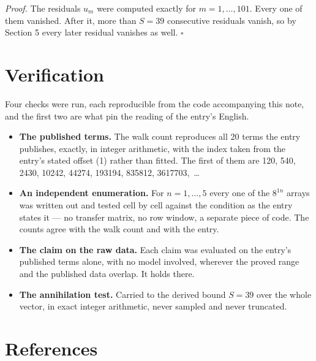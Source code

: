 \documentclass[11pt]{article}
\theoremstyle{definition}
\begin{document}
{\itshape Proof.} The residuals $u_m$ were computed exactly for $m = 1,\dots,101$. Every one of them vanished. After it, more than $S = 39$ consecutive residuals vanish, so by Section 5 every later residual vanishes as well. $\square$

\section{Verification}

Four checks were run, each reproducible from the code accompanying this note, and the first two are what pin the reading of the entry's English.

\begin{itemize}

\item {\bfseries The published terms.} The walk count reproduces all 20 terms the entry publishes, exactly, in integer arithmetic, with the index taken from the entry's stated offset (1) rather than fitted. The first of them are 120, 540, 2430, 10242, 44274, 193194, 835812, 3617703,~\dots

\item {\bfseries An independent enumeration.} For $n = 1,\dots,5$ every one of the $8^{1n}$ arrays was written out and tested cell by cell against the condition as the entry states it --- no transfer matrix, no row window, a separate piece of code. The counts agree with the walk count and with the entry.

\item {\bfseries The claim on the raw data.} Each claim was evaluated on the entry's published terms alone, with no model involved, wherever the proved range and the published data overlap. It holds there.

\item {\bfseries The annihilation test.} Carried to the derived bound $S = 39$ over the whole vector, in exact integer arithmetic, never sampled and never truncated.

\end{itemize}

\section{References}
\end{document}
